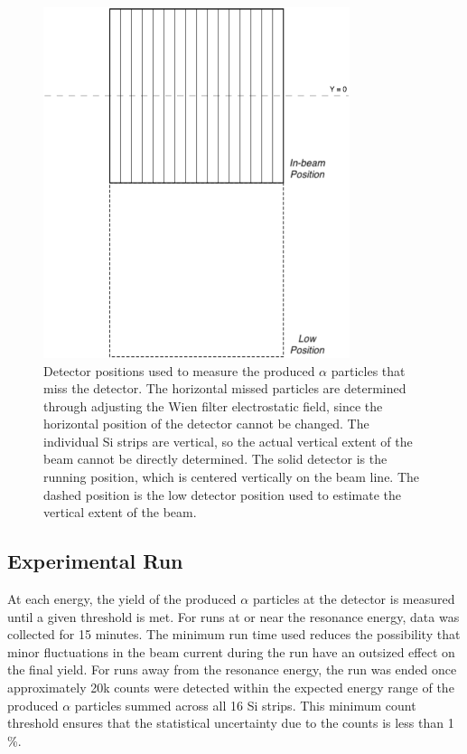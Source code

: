 \begin{figure}
    \begin{center}
        \centerline{\includegraphics[width=0.8\textwidth]{figures/detector_position.png}}
        \caption[Detector positions]{Detector positions used to measure
            the produced $\alpha$ particles that miss the detector. The
            horizontal missed particles are determined through adjusting
            the Wien filter electrostatic field, since the horizontal
            position of the detector cannot be changed. The individual
            Si strips are vertical, so the actual vertical extent of the
            beam cannot be directly determined. The solid detector is
            the running position, which is centered vertically on the
            beam line. The dashed position is the low detector position
            used to estimate the vertical extent of the beam.}
        \label{fig:det-position}
    \end{center}
\end{figure}

\newpage
\subsection{Experimental Run}

At each energy, the yield of the produced $\alpha$ particles at the
detector is measured until a given threshold is met. For runs at or near
the resonance energy, data was collected for 15 minutes. The minimum run
time used reduces the possibility that minor fluctuations in the beam
current during the run have an outsized effect on the final yield. For
runs away from the resonance energy, the run was ended once
approximately 20k counts were detected within the expected energy range
of the produced $\alpha$ particles summed across all 16 Si strips. This
minimum count threshold ensures that the statistical uncertainty due to
the counts is less than 1\,\%.

